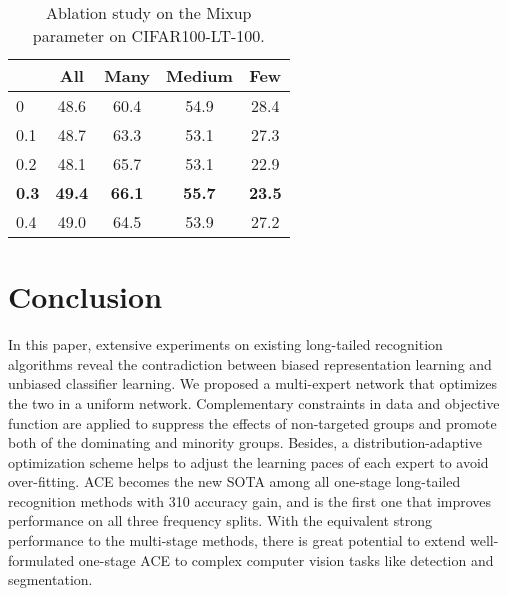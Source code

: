\documentclass[10pt,twocolumn,letterpaper]{article}
\begin{document}
\begin{table}[t]
\begin{center}
\small
\begin{tabular}{p{0.8cm}|c|c c c}
\toprule[1.5pt]
\textbf{} &  \textbf{All} & \textbf{Many} & \textbf{Medium} & \textbf{Few}\\\hline\hline
0 &  48.6 & 60.4 & 54.9 & 28.4\\
0.1 &  48.7 & 63.3 & 53.1 & 27.3 \\
0.2 & 48.1 &  65.7 & 53.1 & 22.9 \\
\textbf{0.3} & \textbf{49.4} & \textbf{66.1} & \textbf{55.7} & \textbf{23.5}\\
0.4 & 49.0 & 64.5  & 53.9 & 27.2\\
\bottomrule[1.5pt]
\end{tabular}
\end{center}
\caption{Ablation study on the Mixup parameter on CIFAR100-LT-100.}
\label{tab:abs-agg}
\end{table}

\section{Conclusion}
In this paper, extensive experiments on existing long-tailed recognition algorithms reveal the contradiction between biased representation learning and unbiased classifier learning. We proposed a multi-expert network that optimizes the two in a uniform network. Complementary constraints in data and objective function are applied to suppress the effects of non-targeted groups and promote both of the dominating and minority groups. Besides, a distribution-adaptive optimization scheme helps to adjust the learning paces of each expert to avoid over-fitting. ACE becomes the new SOTA among all one-stage long-tailed recognition methods with 310 accuracy gain, and is the first one that improves performance on all three frequency splits. With the equivalent strong performance to the multi-stage methods, there is great potential to extend well-formulated one-stage ACE to complex computer vision tasks like detection and segmentation.
{\small \balance


}
\end{document}
